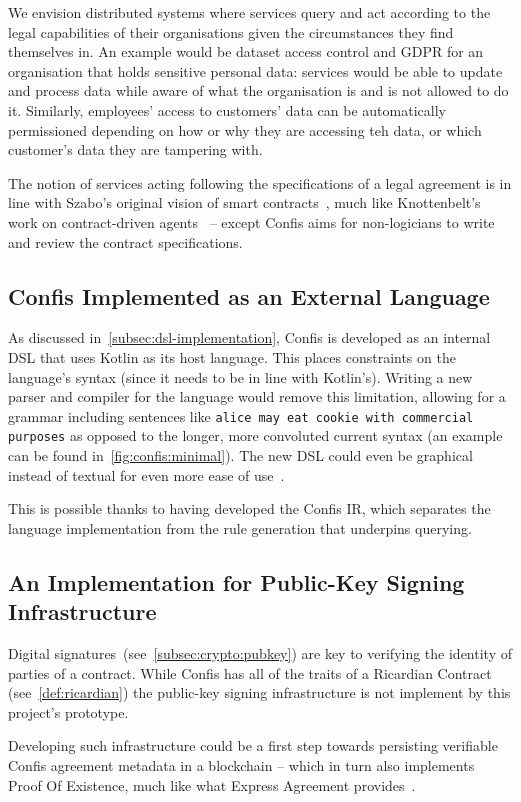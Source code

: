 We envision distributed systems where services query and act according to the legal capabilities of their organisations given the circumstances they find themselves in.
An example would be dataset access control and GDPR for an organisation that holds sensitive personal data: services would be able to update and process data while aware of what the organisation is and is not allowed to do it.
Similarly, employees' access to customers' data can be automatically permissioned depending on how or why they are accessing teh data, or which customer's data they are tampering with.

The notion of services acting following the specifications of a legal agreement is in line with Szabo's original vision of smart contracts~\cite{szabo1997smart-contracts}, much like Knottenbelt's work on contract-driven agents~\cite{knottenbeltContractDriven} -- except Confis aims for non-logicians to write and review the contract specifications.

\subsection{Confis Implemented as an External Language}\label{subsec:confis-as-external-language}

As discussed in~\autoref{subsec:dsl-implementation}, Confis is developed as an internal DSL that uses Kotlin as its host language.
This places constraints on the language's syntax (since it needs to be in line with Kotlin's).
Writing a new parser and compiler for the language would remove this limitation, allowing for a grammar including sentences like \texttt{alice may eat cookie with commercial purposes} as opposed to the longer, more convoluted current syntax (an example can be found in~\autoref{fig:confis:minimal}).
The new DSL could even be graphical instead of textual for even more ease of use~\cite{fowlerLangWorkbench}.

This is possible thanks to having developed the Confis IR, which separates the language implementation from the rule generation that underpins querying.

\subsection{An Implementation for Public-Key Signing Infrastructure}\label{subsec:future:signing}

Digital signatures~(see~\autoref{subsec:crypto:pubkey}) are key to verifying the identity of parties of a contract.
While Confis has all of the traits of a Ricardian Contract (see~\autoref{def:ricardian}) the public-key signing infrastructure is not implement by this project's prototype.

Developing such infrastructure could be a first step towards persisting verifiable Confis agreement metadata in a blockchain -- which in turn also implements Proof Of Existence, much like what Express Agreement provides~\cite{expressAgreement}.
